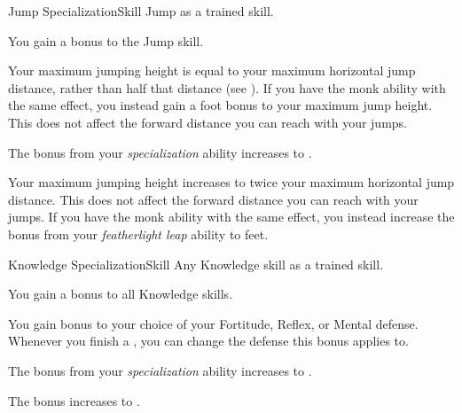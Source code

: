    \begin{feat}{Jump Specialization}{Skill}
        \featpre Jump as a trained skill.

         You gain a  bonus to the Jump skill.

         Your maximum jumping height is equal to your maximum horizontal jump distance, rather than half that distance (see ).
        If you have the  monk ability with the same effect, you instead gain a  foot bonus to your maximum jump height.
        This does not affect the forward distance you can reach with your jumps.

         The bonus from your \textit{specialization} ability increases to .

         Your maximum jumping height increases to twice your maximum horizontal jump distance.
        This does not affect the forward distance you can reach with your jumps.
        If you have the  monk ability with the same effect, you instead increase the bonus from your \textit{featherlight leap} ability to  feet.
    \end{feat}

    \begin{feat}{Knowledge Specialization}{Skill}
        \featpre Any Knowledge skill as a trained skill.

         You gain a  bonus to all Knowledge skills.

         You gain  bonus to your choice of your Fortitude, Reflex, or Mental defense.
        Whenever you finish a , you can change the defense this bonus applies to.

         The bonus from your \textit{specialization} ability increases to .

         The bonus increases to .
    \end{feat}

